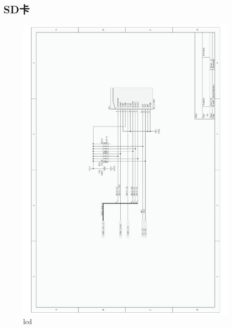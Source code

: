 \documentclass[titlepage]{article}
\begin{document}
 \subsection{SD卡}
 \begin{figure}[h]
  \centering
 \includegraphics[width=11cm]{sd.pdf}
 \caption{lcd}
 \end{figure}

 \newpage
\end{document}

